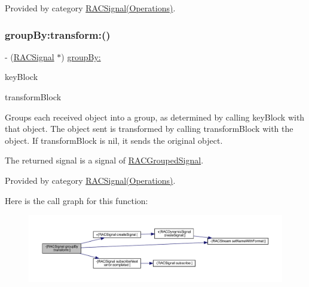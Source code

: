 Provided by category \mbox{\hyperlink{category_r_a_c_signal_07_operations_08_a72e5f2fd80960ee5422e08ceef0f4e2c}{R\+A\+C\+Signal(\+Operations)}}.

\mbox{\label{interface_r_a_c_signal_ad04cf174e24905df96f211b60e31a3cd}} 
\subsubsection{\texorpdfstring{group\+By\+:transform\+:()}{groupBy:transform:()}\hspace{0.1cm}{\footnotesize\ttfamily [1/3]}}
{\footnotesize\ttfamily -\/ (\mbox{\hyperlink{interface_r_a_c_signal}{R\+A\+C\+Signal}} $\ast$) \mbox{\hyperlink{category_r_a_c_signal_07_operations_08_a35f9a656ad047d90f6997aee136782e5}{group\+By\+:}} \begin{DoxyParamCaption}\item[{(id$<$N\+S\+Copying$>$($^\wedge$)(id object))}]{key\+Block }\item[{transform:(id($^\wedge$)(id object))}]{transform\+Block }\end{DoxyParamCaption}}

Groups each received object into a group, as determined by calling {\ttfamily key\+Block} with that object. The object sent is transformed by calling {\ttfamily transform\+Block} with the object. If {\ttfamily transform\+Block} is nil, it sends the original object.

The returned signal is a signal of \mbox{\hyperlink{interface_r_a_c_grouped_signal}{R\+A\+C\+Grouped\+Signal}}. 

Provided by category \mbox{\hyperlink{category_r_a_c_signal_07_operations_08_ad04cf174e24905df96f211b60e31a3cd}{R\+A\+C\+Signal(\+Operations)}}.

Here is the call graph for this function\+:\nopagebreak
\begin{figure}[H]
\begin{center}
\leavevmode
\includegraphics[width=350pt]{interface_r_a_c_signal_ad04cf174e24905df96f211b60e31a3cd_cgraph}
\end{center}
\end{figure}
\mbox{\label{interface_r_a_c_signal_ad04cf174e24905df96f211b60e31a3cd}} 
